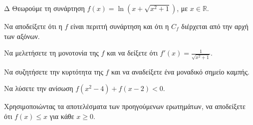 \begin{thema}{Δ}
Θεωρούμε τη συνάρτηση $f(x) = \ln\left( x + \sqrt{x^2+1} \right)$, με $x \in \mathbb{R}$.
\begin{erwthma}
    \item Να αποδείξετε ότι η $f$ είναι περιττή συνάρτηση και ότι η $C_f$ διέρχεται από την αρχή των αξόνων.
    \item Να μελετήσετε τη μονοτονία της $f$ και να δείξετε ότι $f'(x) = \frac{1}{\sqrt{x^2+1}}$. 
    \item Να συζητήσετε την κυρτότητα της $f$ και να αναδείξετε ένα μοναδικό σημείο καμπής.
    \item Να λύσετε την ανίσωση $f(x^2 - 4) + f(x - 2) < 0$.
    \item Χρησιμοποιώντας τα αποτελέσματα των προηγούμενων ερωτημάτων, να αποδείξετε ότι $f(x) \leq x$ για κάθε $x \geq 0$.
\end{erwthma}
\end{thema}
